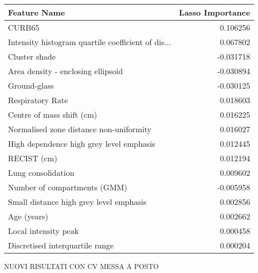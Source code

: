 \begin{tabular}{lr}
\toprule
{Feature Name} &  Lasso Importance \\
\midrule
CURB65                                             &          0.106256 \\
Intensity histogram quartile coefficient of dis... &          0.067802 \\
Cluster shade                                      &         -0.031718 \\
Area density - enclosing ellipsoid                 &         -0.030894 \\
Ground-glass                                       &         -0.030125 \\
Respiratory Rate                                   &          0.018603 \\
Centre of mass shift (cm)                          &          0.016225 \\
Normalised zone distance non-uniformity            &          0.016027 \\
High dependence high grey level emphasis           &          0.012445 \\
RECIST (cm)                                        &          0.012194 \\
Lung consolidation                                 &          0.009602 \\
Number of compartments (GMM)                       &         -0.005958 \\
Small distance high grey level emphasis            &          0.002856 \\
Age (years)                                        &          0.002662 \\
Local intensity peak                               &          0.000458 \\
Discretised interquartile range                    &          0.000204 \\
\bottomrule
\end{tabular}

NUOVI RISULTATI CON CV MESSA A POSTO

